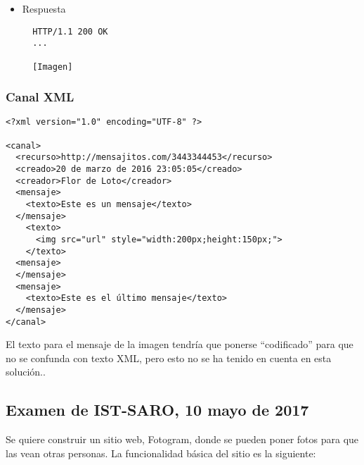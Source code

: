 {\begin{itemize}
\item Respuesta

\begin{verbatim}
  HTTP/1.1 200 OK
  ...

  [Imagen]
\end{verbatim}

\end{itemize}



\subsubsection*{Canal XML}


\begin{verbatim}
<?xml version="1.0" encoding="UTF-8" ?>

<canal>
  <recurso>http://mensajitos.com/3443344453</recurso>
  <creado>20 de marzo de 2016 23:05:05</creado>
  <creador>Flor de Loto</creador>
  <mensaje>
    <texto>Este es un mensaje</texto>
  </mensaje>
    <texto>
      <img src="url" style="width:200px;height:150px;">
    </texto>
  <mensaje>
  </mensaje>
  <mensaje>
    <texto>Este es el último mensaje</texto>
  </mensaje>
</canal>
\end{verbatim}

El texto para el mensaje de la imagen tendría que ponerse ``codificado'' para que no se confunda con texto XML, pero esto no se ha tenido en cuenta en esta solución..



\subsection{Examen de IST-SARO, 10 mayo de 2017}

Se quiere construir un sitio web, Fotogram, donde se pueden poner fotos para que las vean otras personas. La funcionalidad básica del sitio es la siguiente:

}
